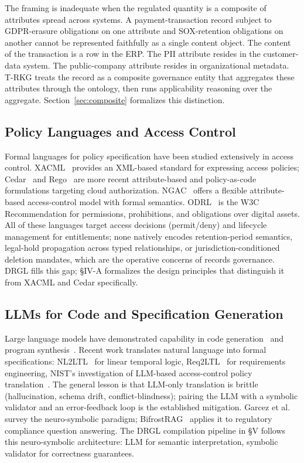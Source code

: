 \documentclass{ieeeaccess}
\begin{document}
The framing is inadequate when the regulated quantity is a composite of attributes spread across systems. A payment-transaction record subject to GDPR-erasure obligations on one attribute and SOX-retention obligations on another cannot be represented faithfully as a single content object. The content of the transaction is a row in the ERP. The PII attribute resides in the customer-data system. The public-company attribute resides in organizational metadata. T-RKG treats the record as a composite governance entity that aggregates these attributes through the ontology, then runs applicability reasoning over the aggregate. Section~\ref{sec:composite} formalizes this distinction.

\subsection{Policy Languages and Access Control}

Formal languages for policy specification have been studied extensively in access control. XACML~\cite{xacml} provides an XML-based standard for expressing access policies; Cedar~\cite{cedar} and Rego~\cite{rego} are more recent attribute-based and policy-as-code formulations targeting cloud authorization. NGAC~\cite{ngac} offers a flexible attribute-based access-control model with formal semantics. ODRL~\cite{odrl} is the W3C Recommendation for permissions, prohibitions, and obligations over digital assets. All of these languages target access decisions (permit/deny) and lifecycle management for entitlements; none natively encodes retention-period semantics, legal-hold propagation across typed relationships, or jurisdiction-conditioned deletion mandates, which are the operative concerns of records governance. DRGL fills this gap; §IV-A formalizes the design principles that distinguish it from XACML and Cedar specifically.

\subsection{LLMs for Code and Specification Generation}

Large language models have demonstrated capability in code generation~\cite{codex} and program synthesis~\cite{austin2021}. Recent work translates natural language into formal specifications: NL2LTL~\cite{nl2ltl} for linear temporal logic, Req2LTL~\cite{req2ltl} for requirements engineering, NIST's investigation of LLM-based access-control policy translation~\cite{nist_lawal2025}. The general lesson is that LLM-only translation is brittle (hallucination, schema drift, conflict-blindness); pairing the LLM with a symbolic validator and an error-feedback loop is the established mitigation. Garcez et al.~\cite{garcez2020} survey the neuro-symbolic paradigm; BifrostRAG~\cite{bifrostrag} applies it to regulatory compliance question answering. The DRGL compilation pipeline in §V follows this neuro-symbolic architecture: LLM for semantic interpretation, symbolic validator for correctness guarantees.
\end{document}
